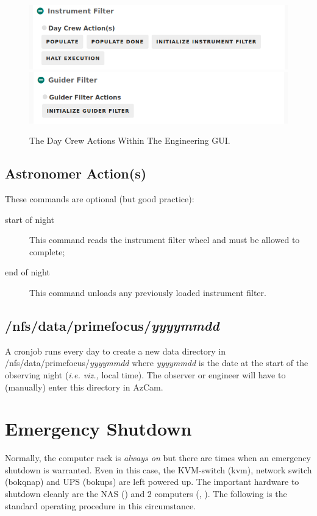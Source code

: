 \documentclass[12pt,twoside]{article}
\begin{document}
\begin{figure}[!h]
 \centering
 \includegraphics[width=0.5\linewidth]{DayCrewActions1.png}
 \includegraphics[width=0.5\linewidth]{DayCrewActions2.png}
 \caption{The Day Crew Actions Within The Engineering GUI.}
 \label{engineer}
\end{figure}

\subsection{Astronomer Action(s)}
\label{astronomeractions}

\noindent These commands are optional (but good practice): 

\begin{description}
 \item[{\sc start of night}] This command reads the instrument filter wheel and must be allowed to complete;
 \item[{\sc end of night}] This command unloads any previously loaded instrument filter.
\end{description}

\subsection{/nfs/data/primefocus/\emph{yyyymmdd}}
\label{datadirectory}

A cronjob runs every day to create a new data directory in /nfs/data/primefocus/\emph{yyyymmdd} where \emph{yyyymmdd} is
the date at the start of the observing night (\emph{i.e. viz.,} local time). The observer or engineer will have to (manually)
enter this directory in AzCam.

\section{Emergency Shutdown}
\label{Emergency Shutdown}

Normally, the computer rack is \emph{always on} but there are times when an emergency shutdown is warranted. Even in this case, 
the KVM-switch (kvm), network switch (bokqnap) and UPS (bokups) are left powered up. The important hardware to shutdown cleanly 
are the NAS () and 2 computers (, ). The following is the standard operating
procedure in this circumstance.
\end{document}
